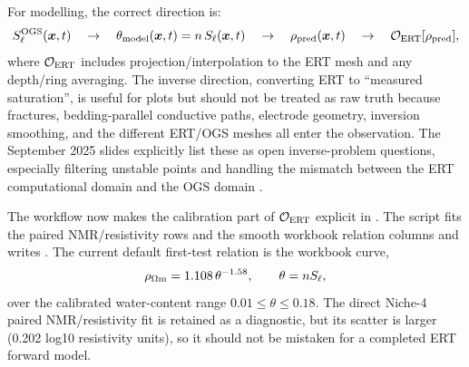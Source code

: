 For modelling, the correct direction is:
\[
S_\ell^{\rm OGS}(\bm x,t)
\quad\rightarrow\quad
\theta_{\rm model}(\bm x,t)=n\,S_\ell(\bm x,t)
\quad\rightarrow\quad
\rho_{\rm pred}(\bm x,t)
\quad\rightarrow\quad
\mathcal O_{\rm ERT}[\rho_{\rm pred}],
\]
where \(\mathcal O_{\rm ERT}\) includes projection/interpolation to the ERT mesh and any
depth/ring averaging.  The inverse direction, converting ERT to ``measured
saturation'', is useful for plots but should not be treated as raw truth because
fractures, bedding-parallel conductive paths, electrode geometry, inversion smoothing,
and the different ERT/OGS meshes all enter the observation.  The September 2025
slides explicitly list these as open inverse-problem questions, especially filtering
unstable points and handling the mismatch between the ERT computational domain and
the OGS domain \cite[PDF pp.~3, 16--17]{CDAModellingSlides2025}.

The workflow now makes the calibration part of \(\mathcal O_{\rm ERT}\) explicit in
.  The script fits
the paired NMR/resistivity rows and the smooth workbook relation columns and writes
.  The current default first-test
relation is the workbook  curve,
\[
\rho_{\Omega{\rm m}} = 1.108\,\theta^{-1.58},
\qquad \theta=nS_\ell ,
\]
over the calibrated water-content range \(0.01\le\theta\le0.18\).  The direct Niche-4
paired NMR/resistivity fit is retained as a diagnostic, but its scatter is larger
(0.202 log10 resistivity units), so it should not be mistaken for a completed ERT
forward model.

